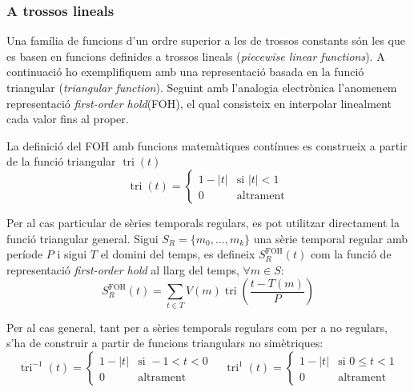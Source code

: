 \subsubsection{A trossos lineals}

Una família de funcions d'un ordre superior a les de trossos constants
són les que es basen en funcions definides a trossos lineals
(\emph{piecewise linear functions}).  A continuació ho exemplifiquem
amb una representació basada en la funció triangular (\emph{triangular
  function}). Seguint amb l'analogia electrònica l'anomenem
representació \emph{first-order hold}(FOH), el qual consisteix en
interpolar linealment cada valor fins al proper.


La definició del FOH amb funcions matemàtiques contínues es construeix
a partir de la funció triangular $\operatorname{tri}(t)$
\[
\operatorname{tri}(t) = 
\begin{cases}
  1-|t| & \text{si } |t| < 1\\
  0 & \text{altrament}
\end{cases}
\]

Per al cas particular de sèries temporals regulars, es pot
utilitzar directament la funció triangular general.  Sigui
$S_R=\{m_0,\ldots,m_k\}$ una sèrie temporal regular amb període $P$ i
sigui $T$ el domini del temps, es defineix $S^\text{FOH}_ R(t)$ com la
funció de representació \emph{first-order hold} al llarg del temps,
$\forall m \in S:$
\[
S_ R^\text{FOH}(t) = \sum_{t\in T} V(m)
\operatorname{tri}\left(\frac{t-T(m)}{P}\right)
\]



Per al cas general, tant per a sèries temporals regulars com per a no
regulars, s'ha de construir a partir de funcions triangulars no
simètriques:
\[
\operatorname{tri}^{-1}(t) = 
\begin{cases}
  1-|t| & \text{si } -1 < t < 0\\
  0 & \text{altrament}
\end{cases}
\quad
\operatorname{tri}^1(t) = 
\begin{cases}
  1-|t| & \text{si } 0 \leq t < 1\\
  0 & \text{altrament}
\end{cases}
\]


